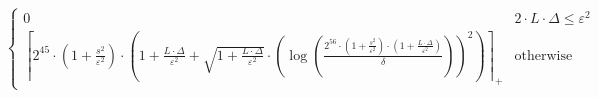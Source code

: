 \[\begin{cases} 0 & 2 \cdot L \cdot \Delta \leq \varepsilon^{2} \\ \left\lceil 2^{45} \cdot \left(1 + \frac{s^{2}}{\varepsilon^{2}}\right) \cdot \left(1 + \frac{L \cdot \Delta}{\varepsilon^{2}} + \sqrt{1 + \frac{L \cdot \Delta}{\varepsilon^{2}}} \cdot \left(\log\left(\frac{2^{56} \cdot \left(1 + \frac{s^{2}}{\varepsilon^{2}}\right) \cdot \left(1 + \frac{L \cdot \Delta}{\varepsilon^{2}}\right)}{\delta}\right)\right)^{2}\right) \right\rceil_{+} & \mathrm{otherwise} \end{cases}\]
